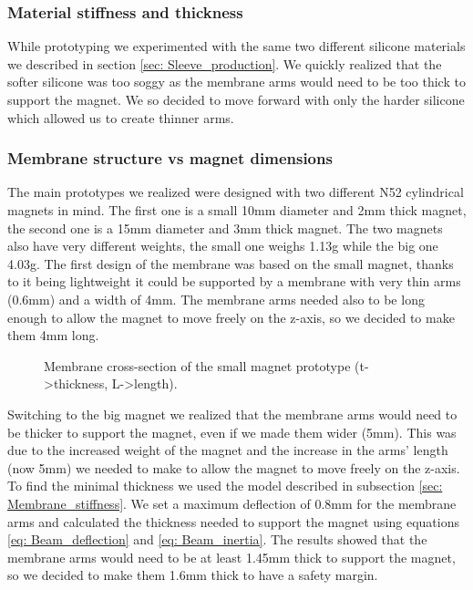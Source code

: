 \subsubsection{Material stiffness and thickness}
While prototyping we experimented with the same two different silicone materials we described in section \ref{sec: Sleeve_production}.
We quickly realized that the softer silicone was too soggy as the membrane arms would need to be too thick to support the magnet.
We so decided to move forward with only the harder silicone which allowed us to create thinner arms.

\subsubsection{Membrane structure vs magnet dimensions}
The main prototypes we realized were designed with two different N52 cylindrical magnets in mind.
The first one is a small 10mm diameter and 2mm thick magnet, the second one is a 15mm diameter and 3mm thick magnet.
The two magnets also have very different weights, the small one weighs 1.13g while the big one 4.03g.
The first design of the membrane was based on the small magnet, thanks to it being lightweight it could be supported by a membrane with very thin arms (0.6mm) and a width of 4mm.
The membrane arms needed also to be long enough to allow the magnet to move freely on the z-axis, so we decided to make them 4mm long.
\begin{figure}
    \centering
    \caption{Membrane cross-section of the small magnet prototype (t->thickness, L->length).}
    \label{fig: Membrane_v1_section}
\end{figure}

Switching to the big magnet we realized that the membrane arms would need to be thicker to support the magnet, even if we made them wider (5mm).
This was due to the increased weight of the magnet and the increase in the arms' length (now 5mm) we needed to make to allow the magnet to move freely on the z-axis.
To find the minimal thickness we used the model described in subsection \ref{sec: Membrane_stiffness}.
We set a maximum deflection of 0.8mm for the membrane arms and calculated the thickness needed to support the magnet using equations \ref{eq: Beam_deflection} and \ref{eq: Beam_inertia}.
The results showed that the membrane arms would need to be at least 1.45mm thick to support the magnet, so we decided to make them 1.6mm thick to have a safety margin.

